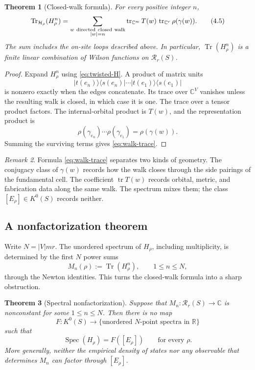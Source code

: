 \documentclass[11pt]{article}
\newtheorem{theorem}{Theorem}[section]
\theoremstyle{definition}
\theoremstyle{remark}
\newtheorem{remark}[theorem]{Remark}
\newcommand{\CC}{\mathbb C}
\newcommand{\RR}{\mathbb R}
\newcommand{\Tr}{\operatorname{Tr}}
\newcommand{\tr}{\operatorname{tr}}
\newcommand{\spec}{\operatorname{Spec}}
\newcommand{\cR}{\mathcal R}
\newcommand{\cH}{\mathcal H}
\newcommand{\ket}[1]{\lvert #1\rangle}
\newcommand{\bra}[1]{\langle #1\rvert}
\begin{document}
\begin{theorem}[Closed-walk formula]
\label{thm:walk-formula}
For every positive integer \(n\),
\[
  \Tr_{\cH_\rho}(H_\rho^n)
   =
  \sum_{\substack{w\ {\rm directed\ closed\ walk}\\ |w|=n}}
        \tr_{\CC^m}T(w)\,
        \tr_{\CC^r}\rho(\gamma(w)).
  \tag{4.5}\label{eq:walk-trace}
\]
The sum includes the on-site loops described above.  In particular,
\(\Tr(H_\rho^n)\) is a finite linear combination of Wilson functions on
\(\cR_r(S)\).
\end{theorem}

\begin{proof}
Expand \(H_\rho^n\) using \eqref{eq:twisted-H}.  A product of matrix units
\[
 \ket{t(e_n)}\bra{s(e_n)}
 \cdots
 \ket{t(e_1)}\bra{s(e_1)}
\]
is nonzero exactly when the edges concatenate.  Its trace over \(\CC^V\)
vanishes unless the resulting walk is closed, in which case it is one.
The trace over a tensor product factors.  The internal-orbital product is
\(T(w)\), and the representation product is
\[
 \rho(\gamma_{e_n})\cdots\rho(\gamma_{e_1})
 =\rho(\gamma(w)).
\]
Summing the surviving terms gives \eqref{eq:walk-trace}.
\end{proof}

\begin{remark}
Formula \eqref{eq:walk-trace} separates two kinds of geometry.  The conjugacy
class of \(\gamma(w)\) records how the walk closes through the side pairings
of the fundamental cell.  The coefficient \(\tr T(w)\) records orbital,
metric, and fabrication data along the same walk.  The spectrum mixes them;
the class \([E_\rho]\in K^0(S)\) records neither.
\end{remark}

\subsection{A nonfactorization theorem}

Write \(N=|V|mr\).  The unordered spectrum of \(H_\rho\), including
multiplicity, is determined by the first \(N\) power sums
\[
          M_n(\rho):=\Tr(H_\rho^n),\qquad 1\leq n\leq N,
\]
through the Newton identities.  This turns the closed-walk formula into a
sharp obstruction.

\begin{theorem}[Spectral nonfactorization]
\label{thm:spectral-nonfactorization}
Suppose that \(M_n:\cR_r(S)\to\CC\) is nonconstant for some
\(1\leq n\leq N\).  Then there is no map
\[
           F:K^0(S)\longrightarrow
             \{\text{unordered \(N\)-point spectra in \(\RR\)}\}
\]
such that
\[
                 \spec(H_\rho)=F([E_\rho])
                 \qquad\text{for every }\rho.
                 \tag{4.6}\label{eq:no-spectrum-factor}
\]
More generally, neither the empirical density of states nor any observable
that determines \(M_n\) can factor through \([E_\rho]\).
\end{theorem}
\end{document}
